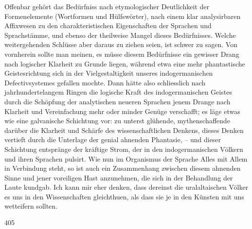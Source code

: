 Offenbar gehört das Bedürfniss nach etymologischer Deutlichkeit der Formenelemente (Wortformen und Hülfswörter), nach einem klar analysirbaren Affixwesen zu den charakteristischen Eigenschaften der Sprachen und Sprachstämme, und ebenso der theilweise Mangel dieses Bedürfnisses. Welche weitergehenden Schlüsse aber daraus zu ziehen seien, ist schwer zu sagen. Von vornherein sollte man meinen, es müsse diesem Bedürfnisse ein gewisser Drang nach logischer Klarheit zu Grunde liegen, während etwa eine mehr phantastische Geistesrichtung sich in der Vielgestaltigkeit unseres indogermanischen Defectivsystemes gefallen mochte. Dann hätte also schliesslich nach jahrhundertelangem Ringen die logische Kraft des indogermanischen Geistes durch die Schöpfung der analytischen neueren Sprachen jenem Drange nach Klarheit und Vereinfachung mehr oder minder Genüge verschafft; es läge etwas wie eine galvanische Schichtung vor: zu unterst glühende, mythenschaffende  darüber die Klarheit und Schärfe des wissenschaftlichen Denkens, dieses Denken vertieft durch die Unterlage der genial ahnenden Phantasie, – und dieser Schichtung entspränge der kräftige Strom, der in den indogermanischen Völkern und ihren Sprachen pulsirt. Wie nun im Organismus der Sprache Alles mit Allem in Verbindung steht, so ist auch ein Zusammenhang zwischen diesem ahnenden Sinne und jener voreiligen Hast anzunehmen, die sich in der Behandlung der Laute kundgab. Ich kann mir eher denken, dass dereinst die uralaltaischen Völker es uns in den Wissenschaften gleichthuen, als dass sie je in den Künsten mit uns wetteifern sollten.

 {\textbar}{\textbar}405{\textbar}{\textbar}\label{sp.405} 

